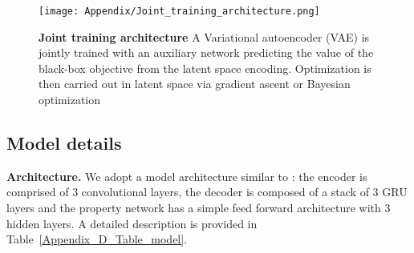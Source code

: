 \begin{figure}[h]
    \centering
    \texttt{[image: Appendix/Joint\_training\_architecture.png]}
    \caption{\textbf{Joint training architecture} A Variational autoencoder (VAE) is jointly trained with an auxiliary network predicting the value of the black-box objective from the latent space encoding. Optimization is then carried out in latent space via gradient ascent or Bayesian optimization}
    \label{Appendix_Figure_Joint_training_architecture}
\end{figure}

\subsection{Model details}
\label{Appendix_D.2_Molecule_CVAE_Model}

\textbf{Architecture.} We adopt a model architecture similar to \citet{Gomez_Bombarelli_2018}: the encoder is comprised of 3 convolutional layers, the decoder is composed of a stack of 3 GRU layers \citep{cho2014properties} and the property network has a simple feed forward architecture with 3 hidden layers. A detailed description is provided in Table~\ref{Appendix_D_Table_model}.

\begin{table}[h]
\begin{center}
\caption{\textbf{Molecular generation with CVAE - Model architecture details}}
\label{Appendix_D_Table_model}
\end{center}
\end{table}

